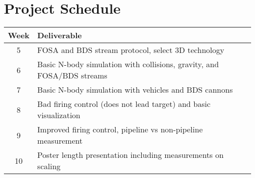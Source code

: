\chapter*{Project Schedule}

\begin{tabular}{c | l}
Week & Deliverable\\
\hline
5 & FOSA and BDS stream protocol, select 3D technology\\
6 & Basic N-body simulation with collisions, gravity, and FOSA/BDS streams\\
7 & Basic N-body simulation with vehicles and BDS cannons\\
8 & Bad firing control (does not lead target) and basic visualization\\
9 & Improved firing control, pipeline vs non-pipeline measurement\\
10 & Poster length presentation including measurements on scaling\\
\end{tabular}